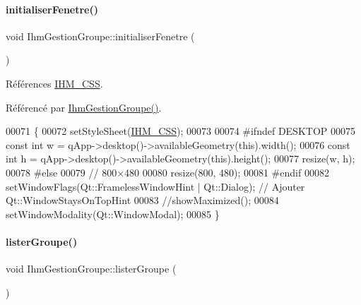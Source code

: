 \paragraph{\texorpdfstring{initialiser\+Fenetre()}{initialiserFenetre()}}
{\footnotesize\ttfamily void Ihm\+Gestion\+Groupe\+::initialiser\+Fenetre (\begin{DoxyParamCaption}{ }\end{DoxyParamCaption})\hspace{0.3cm}{\ttfamily [private]}}



Références \hyperlink{e-stock_8h_a7185157bd11830373a0f95d0dc88b2c3}{I\+H\+M\+\_\+\+C\+SS}.



Référencé par \hyperlink{class_ihm_gestion_groupe_a27632f9cf5b66f4403c3534ee0e0ad18}{Ihm\+Gestion\+Groupe()}.


\begin{DoxyCode}
00071 \{
00072     setStyleSheet(\hyperlink{e-stock_8h_a7185157bd11830373a0f95d0dc88b2c3}{IHM\_CSS});
00073 
00074 \textcolor{preprocessor}{    #ifndef DESKTOP}
00075     \textcolor{keyword}{const} \textcolor{keywordtype}{int} w = qApp->desktop()->availableGeometry(\textcolor{keyword}{this}).width();
00076     \textcolor{keyword}{const} \textcolor{keywordtype}{int} h = qApp->desktop()->availableGeometry(\textcolor{keyword}{this}).height();
00077     resize(w, h);
00078 \textcolor{preprocessor}{    #else}
00079     \textcolor{comment}{// 800×480}
00080     resize(800, 480);
00081 \textcolor{preprocessor}{    #endif}
00082     setWindowFlags(Qt::FramelessWindowHint | Qt::Dialog); \textcolor{comment}{// Ajouter Qt::WindowStaysOnTopHint}
00083     \textcolor{comment}{//showMaximized();}
00084     setWindowModality(Qt::WindowModal);
00085 \}
\end{DoxyCode}
\mbox{\label{class_ihm_gestion_groupe_a7afabe81c405b35e7cfd4e760eda8c84}} 
\paragraph{\texorpdfstring{lister\+Groupe()}{listerGroupe()}}
{\footnotesize\ttfamily void Ihm\+Gestion\+Groupe\+::lister\+Groupe (\begin{DoxyParamCaption}{ }\end{DoxyParamCaption})\hspace{0.3cm}{\ttfamily [private]}}



